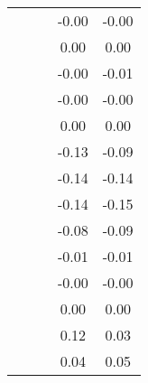 \begin{table}
\begin{tabular}{c|cc|cc|}
\multicolumn{1}{|c|}{} & \multicolumn{1}{|c|}{} & \multicolumn{1}{|c|}{} & \multicolumn{1}{|c|}{     -0.00} & \multicolumn{1}{|c|}{     -0.00} \\ 
\multicolumn{1}{|c|}{} & \multicolumn{1}{|c|}{} & \multicolumn{1}{|c|}{} & \multicolumn{1}{|c|}{      0.00} & \multicolumn{1}{|c|}{      0.00} \\ 
\multicolumn{1}{|c|}{} & \multicolumn{1}{|c|}{} & \multicolumn{1}{|c|}{} & \multicolumn{1}{|c|}{     -0.00} & \multicolumn{1}{|c|}{     -0.01} \\ 
\multicolumn{1}{|c|}{} & \multicolumn{1}{|c|}{} & \multicolumn{1}{|c|}{} & \multicolumn{1}{|c|}{     -0.00} & \multicolumn{1}{|c|}{     -0.00} \\ 
\multicolumn{1}{|c|}{} & \multicolumn{1}{|c|}{} & \multicolumn{1}{|c|}{} & \multicolumn{1}{|c|}{      0.00} & \multicolumn{1}{|c|}{      0.00} \\ 
\multicolumn{1}{|c|}{} & \multicolumn{1}{|c|}{} & \multicolumn{1}{|c|}{} & \multicolumn{1}{|c|}{     -0.13} & \multicolumn{1}{|c|}{     -0.09} \\ 
\multicolumn{1}{|c|}{} & \multicolumn{1}{|c|}{} & \multicolumn{1}{|c|}{} & \multicolumn{1}{|c|}{     -0.14} & \multicolumn{1}{|c|}{     -0.14} \\ 
\multicolumn{1}{|c|}{} & \multicolumn{1}{|c|}{} & \multicolumn{1}{|c|}{} & \multicolumn{1}{|c|}{     -0.14} & \multicolumn{1}{|c|}{     -0.15} \\ 
\multicolumn{1}{|c|}{} & \multicolumn{1}{|c|}{} & \multicolumn{1}{|c|}{} & \multicolumn{1}{|c|}{     -0.08} & \multicolumn{1}{|c|}{     -0.09} \\ 
\multicolumn{1}{|c|}{} & \multicolumn{1}{|c|}{} & \multicolumn{1}{|c|}{} & \multicolumn{1}{|c|}{     -0.01} & \multicolumn{1}{|c|}{     -0.01} \\ 
\multicolumn{1}{|c|}{} & \multicolumn{1}{|c|}{} & \multicolumn{1}{|c|}{} & \multicolumn{1}{|c|}{     -0.00} & \multicolumn{1}{|c|}{     -0.00} \\ 
\multicolumn{1}{|c|}{} & \multicolumn{1}{|c|}{} & \multicolumn{1}{|c|}{} & \multicolumn{1}{|c|}{      0.00} & \multicolumn{1}{|c|}{      0.00} \\ 
\multicolumn{1}{|c|}{} & \multicolumn{1}{|c|}{} & \multicolumn{1}{|c|}{} & \multicolumn{1}{|c|}{      0.12} & \multicolumn{1}{|c|}{      0.03} \\ 
\multicolumn{1}{|c|}{} & \multicolumn{1}{|c|}{} & \multicolumn{1}{|c|}{} & \multicolumn{1}{|c|}{      0.04} & \multicolumn{1}{|c|}{      0.05} \\ 

\end{tabular}
\end{table}
